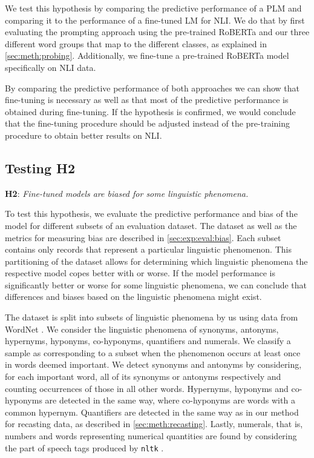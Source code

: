 We test this hypothesis by comparing the predictive performance of a \ac{PLM} and comparing it to the performance of a fine-tuned \ac{LM} for \ac{NLI}. We do that by first evaluating the prompting approach using the pre-trained \ac{RoBERTa} and our three different word groups that map to the different classes, as explained in \autoref{sec:meth:probing}. Additionally, we fine-tune a pre-trained \ac{RoBERTa} model specifically on \ac{NLI} data. 

By comparing the predictive performance of both approaches we can show that fine-tuning is necessary as well as that most of the predictive performance is obtained during fine-tuning. If the hypothesis is confirmed, we would conclude that the fine-tuning procedure should be adjusted instead of the pre-training procedure to obtain better results on \ac{NLI}.

\subsection{Testing H2}
\textbf{H2}: \textit{Fine-tuned models are biased for some linguistic phenomena.}

To test this hypothesis, we evaluate the predictive performance and bias of the model for different subsets of an evaluation dataset. The dataset as well as the metrics for measuring bias are described in \autoref{sec:exp:eval:bias}. Each subset contains only records that represent a particular linguistic phenomenon. This partitioning of the dataset allows for determining which linguistic phenomena the respective model copes better with or worse. If the model performance is significantly better or worse for some linguistic phenomena, we can conclude that differences and biases based on the linguistic phenomena might exist.

The dataset is split into subsets of linguistic phenomena by us using data from WordNet \cite{miller-1994-wordnet}. We consider the linguistic phenomena of synonyms, antonyms, hypernyms, hyponyms, co-hyponyms, quantifiers and numerals. We classify a sample as corresponding to a subset when the phenomenon occurs at least once in words deemed important. We detect synonyms and antonyms by considering, for each important word, all of its synonyms or antonyms respectively and counting occurrences of those in all other words. Hypernyms, hyponyms and co-hyponyms are detected in the same way, where co-hyponyms are words with a common hypernym. Quantifiers are detected in the same way as in our method for recasting data, as described in \autoref{sec:meth:recasting}. Lastly, numerals, that is, numbers and words representing numerical quantities are found by considering the part of speech tags produced by \texttt{nltk} \cite{nltk}.

